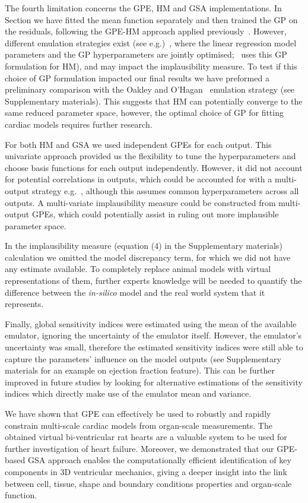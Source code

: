 The fourth limitation concerns the GPE, HM and GSA implementations. In Section we have fitted the mean function separately and then trained the GP on the residuals, following the GPE-HM approach applied previously~\cite{Salter:2016,Vernon:2018}. However, different emulation strategies exist (see e.g.)~\cite{Oakley:2004}, where the linear regression model parameters and the GP hyperparameters are jointly optimised;~\cite{Coveney:2018} uses this GP formulation for HM), and may impact the implausibility measure. To test if this choice of GP formulation impacted our final results we have preformed a preliminary comparison with the Oakley and O'Hagan~\cite{Oakley:2004} emulation strategy (see Supplementary materials). This suggests that HM can potentially converge to the same reduced parameter space, however, the optimal choice of GP for fitting cardiac models requires further research.

For both HM and GSA we used independent GPEs for each output. This univariate approach provided us the flexibility to tune the hyperparameters and choose basis functions for each output independently. However, it did not account for potential correlations in outputs, which could be accounted for with a multi-output strategy e.g.~\cite{Conti:2009}, although this assumes common hyperparameters across all outputs. A multi-variate implausibility measure could be constructed from multi-output GPEs, which could potentially assist in ruling out more implausible parameter space.

In the implausibility measure (equation ($4$) in the Supplementary materials) calculation we omitted the model discrepancy term, for which we did not have any estimate available. To completely replace animal models with virtual representations of them, further experts knowledge will be needed to quantify the difference between the \textit{in-silico} model and the real world system that it represents. 

Finally, global sensitivity indices were estimated using the mean of the available emulator, ignoring the uncertainty of the emulator itself. However, the emulator's uncertainty was small, therefore the estimated sensitivity indices were still able to capture the parameters' influence on the model outputs (see Supplementary materials for an example on ejection fraction feature). This can be further improved in future studies by looking for alternative estimations of the sensitivity indices which directly make use of the emulator mean and variance.

\vspace{0.2cm}
We have shown that GPE can effectively be used to robustly and rapidly constrain multi-scale cardiac models from organ-scale measurements. The obtained virtual bi-ventricular rat hearts are a valuable system to be used for further investigation of heart failure. Moreover, we demonstrated that our GPE-based GSA approach enables the computationally efficient identification of key components in 3D ventricular mechanics, giving a deeper insight into the link between cell, tissue, shape and boundary conditions properties and organ-scale function.